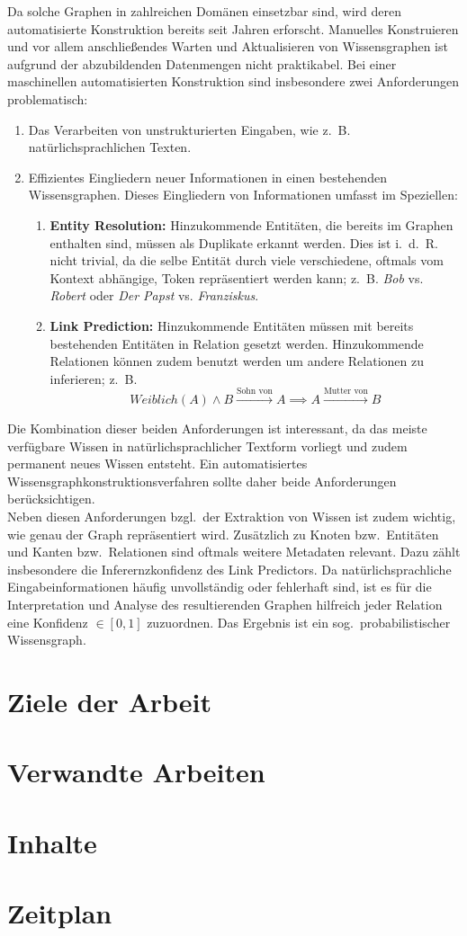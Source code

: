 \documentclass[11pt, a4paper]{scrreprt}
\begin{document}
Da solche Graphen in zahlreichen Domänen einsetzbar sind, wird deren automatisierte Konstruktion bereits seit Jahren erforscht.
Manuelles Konstruieren und vor allem anschließendes Warten und Aktualisieren von Wissensgraphen ist aufgrund der abzubildenden Datenmengen nicht praktikabel.
Bei einer maschinellen automatisierten Konstruktion sind insbesondere zwei Anforderungen problematisch:
\begin{enumerate}
	\item Das Verarbeiten von unstrukturierten Eingaben, wie z.~B. natürlichsprachlichen Texten.
	\item Effizientes Eingliedern neuer Informationen in einen bestehenden Wissensgraphen.
		Dieses Eingliedern von Informationen umfasst im Speziellen:
		\begin{enumerate}
			\item \textbf{Entity Resolution:}
				Hinzukommende Entitäten, die bereits im Graphen enthalten sind, müssen als Duplikate erkannt werden.
				Dies ist i.~d.~R. nicht trivial, da die selbe Entität durch viele verschiedene, oftmals vom Kontext abhängige, Token repräsentiert werden kann;
				z.~B. \textit{Bob} vs. \textit{Robert} oder \textit{Der Papst} vs. \textit{Franziskus}.
			\item \textbf{Link Prediction:}
				Hinzukommende Entitäten müssen mit bereits bestehenden Entitäten in Relation gesetzt werden.
				Hinzukommende Relationen können zudem benutzt werden um andere Relationen zu inferieren;
				z.~B. $$Weiblich(A) \land B \xrightarrow{\text{Sohn~von}} A \implies A \xrightarrow{\text{Mutter~von}} B$$
		\end{enumerate}
\end{enumerate}

Die Kombination dieser beiden Anforderungen ist interessant, da das meiste verfügbare Wissen in natürlichsprachlicher Textform vorliegt und zudem permanent neues Wissen entsteht.
Ein automatisiertes Wissensgraphkonstruktionsverfahren sollte daher beide Anforderungen berücksichtigen.\\

Neben diesen Anforderungen bzgl.\ der Extraktion von Wissen ist zudem wichtig, wie genau der Graph repräsentiert wird.
Zusätzlich zu Knoten bzw.\ Entitäten und Kanten bzw.\ Relationen sind oftmals weitere Metadaten relevant.
Dazu zählt insbesondere die Inferernzkonfidenz des Link Predictors.
Da natürlichsprachliche Eingabeinformationen häufig unvollständig oder fehlerhaft sind, ist es für die Interpretation und Analyse des resultierenden Graphen hilfreich jeder Relation eine Konfidenz $\in [0, 1]$ zuzuordnen.
Das Ergebnis ist ein sog.\ probabilistischer Wissensgraph.

\section{Ziele der Arbeit}

\section{Verwandte Arbeiten}

\section{Inhalte}

\section{Zeitplan}
\end{document}
